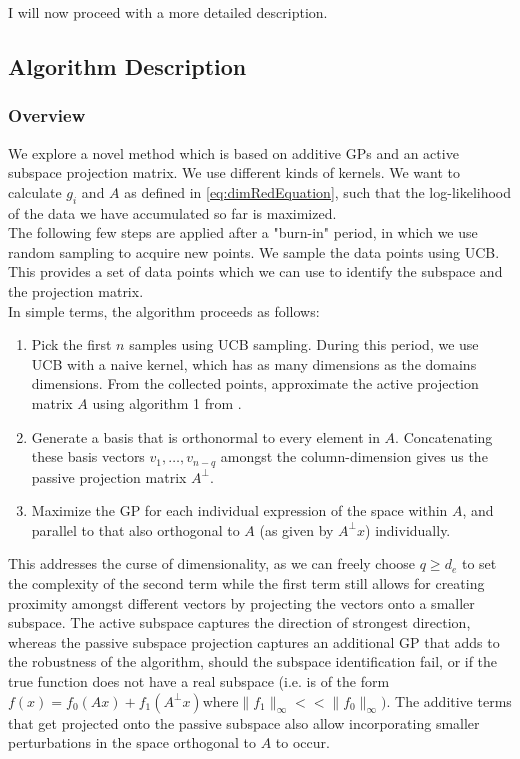 I will now proceed with a more detailed description.

\subsection{Algorithm Description}

\subsubsection{Overview}

We explore a novel method which is based on additive GPs and an active subspace projection matrix.
We use different kinds of kernels.
We want to calculate $g_i$ and $A$ as defined in \ref{eq:dimRedEquation}, such that the log-likelihood of the data we have accumulated so far is maximized.\\
 
 The following few steps are applied after a "burn-in" period, in which we use random sampling to acquire new points.
 We sample the data points using UCB.
 This provides a set of data points which we can use to identify the subspace and the projection matrix.\\
 
 In simple terms, the algorithm proceeds as follows:
 
 \begin{enumerate}
 \item Pick the first $n$ samples using UCB sampling.
 During this period, we use UCB with a naive kernel, which has as many dimensions as the domains dimensions.
 From the collected points, approximate the active projection matrix $A$ using algorithm 1 from \citep{Tripathy}.
 \item Generate a basis that is orthonormal to every element in $A$.
 Concatenating these basis vectors $v_1, \ldots, v_{n-{q}}$ amongst the column-dimension gives us the passive projection matrix $A^\bot$.
 \item Maximize the GP for each individual expression of the space within $A$, and parallel to that also orthogonal to $A$ (as given by $A^\bot x$) individually. 
 \end{enumerate}
 
 This addresses the curse of dimensionality, as we can freely choose $q \geq d_e$ to set the complexity of the second term while the first term still allows for creating proximity amongst different vectors by projecting the vectors onto a smaller subspace.
The active subspace captures the direction of strongest direction, whereas the passive subspace projection captures an additional GP that adds to the robustness of the algorithm, should the subspace identification fail, or if the true function does not have a real subspace (i.e. is of the form $f(x) = f_0(Ax) + f_1(A^{\bot}x) \text{where} \lVert f_1 \rVert_{\infty} << \lVert f_0 \rVert_{\infty})$.
The additive terms that get projected onto the passive subspace also allow incorporating smaller perturbations in the space orthogonal to $A$ to occur.

